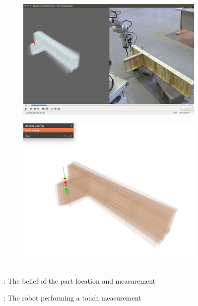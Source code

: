 \documentclass[../thesis.tex]{subfiles}
\begin{document}
\begin{figure}
\centering
    \begin{subfigure}[b]{.49\linewidth}
      \includegraphics[width=\linewidth, clip, trim=9in 3in 0in 1in]{./Introduction/Overview2}
        \caption{}
        \label{fig:Rigid:Overview_1}
    \end{subfigure}
    \hfill
    \begin{subfigure}[b]{.49\linewidth}
      \includegraphics[width=\linewidth, clip, trim=1.5in 1.5in 1.5in 1.3in]{./Introduction/Particle_Intersection}
        \caption{}
        \label{fig:Rigid:Overview_2}
    \end{subfigure}
\caption{: The robot performing a touch measurement}\\
: The belief of the part location and measurement
\label{fig:Rigid:Overview}
\end{figure}
\end{document}
